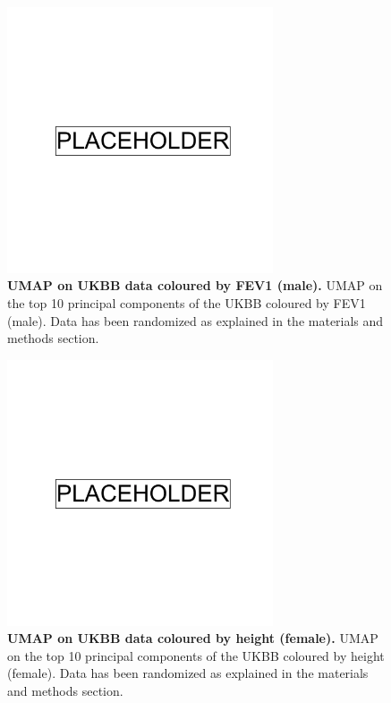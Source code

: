 \newpage

\begin{figure}
    \centering
    \includegraphics[width=0.7\textwidth]{placeholder.png}
    \caption[UMAP on UKBB data coloured by FEV1 (male)]{\textbf{UMAP on UKBB data coloured by FEV1 (male).} UMAP on the top 10 principal components of the UKBB coloured by FEV1 (male). Data has been randomized as explained in the materials and methods section.}
    \label{fig:supp_ukbb_fev_m}
\end{figure}

\newpage

\begin{figure}
    \centering
    \includegraphics[width=0.7\textwidth]{placeholder.png}
    \caption[UMAP on UKBB data coloured by height (female)]{\textbf{UMAP on UKBB data coloured by height (female).} UMAP on the top 10 principal components of the UKBB coloured by height (female). Data has been randomized as explained in the materials and methods section.}
    \label{fig:supp_ukbb_height_f}
\end{figure}

